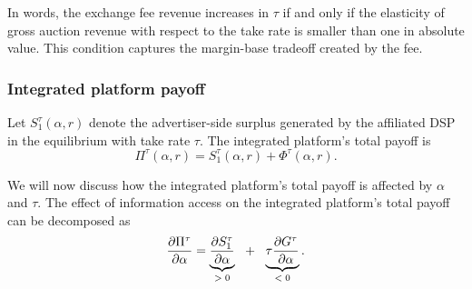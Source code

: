 \documentclass[11pt]{article}
\theoremstyle{plain}
\theoremstyle{definition}
\theoremstyle{plain}
\theoremstyle{plain}
\theoremstyle{plain}
\theoremstyle{plain}
\numberwithin{equation}{section}
\begin{document}
\vspace{0.2cm}

\noindent In words, the exchange fee revenue increases in $ \tau $ if and only if the elasticity of gross auction revenue with respect to the take rate is smaller than one in absolute value. This condition captures
the margin-base tradeoff created by the fee.

\subsubsection{Integrated platform payoff}

Let $ S_1^\tau(\alpha,r) $ denote the advertiser-side surplus generated by the affiliated DSP in the equilibrium with take rate $\tau$. The integrated platform's total payoff is
\[
\Pi^\tau(\alpha,r)
=
S_1^\tau(\alpha,r)+\Phi^\tau(\alpha,r).
\]

\noindent We will now discuss how the integrated platform's total payoff is affected by $ \alpha $ and $ \tau $. The effect of information access on the integrated platform's total payoff can be decomposed as
\[
\frac{\partial \Pi^\tau}{\partial \alpha}
=
\underbrace{\frac{\partial S_1^\tau}{\partial \alpha}}_\text{$ > 0 $}
\ \ + \ \
\underbrace{\tau\frac{\partial G^\tau}{\partial \alpha}}_\text{$ < 0 $}.
\]
\end{document}
